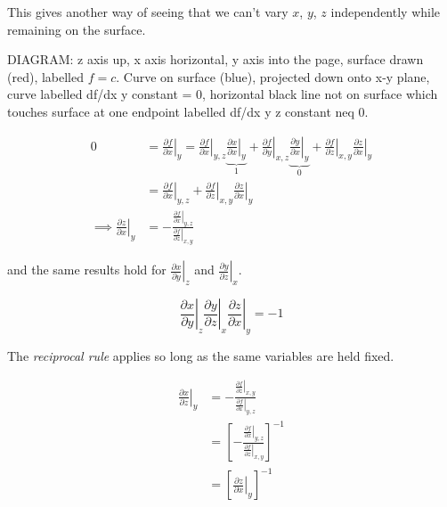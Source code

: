 \documentclass{../../template/note}
\begin{document}
    This gives another way of seeing that we can't vary \(x\), \(y\), \(z\) independently while remaining on the surface.

    DIAGRAM: z axis up, x axis horizontal, y axis into the page, surface drawn (red), labelled \(f = c\). Curve on surface (blue), projected down onto x-y plane, curve labelled df/dx y constant = 0, horizontal black line not on surface which touches surface at one endpoint labelled df/dx y z constant neq 0.

    \begin{align*}
        0 & = \left.\frac{\partial f}{\partial x}\right|_y = \left.\frac{\partial f}{\partial x}\right|_{y, z} \underbrace{\left.\frac{\partial x}{\partial x}\right|_{y}}_{1} + \left.\frac{\partial f}{\partial y}\right|_{x, z} \underbrace{\left.\frac{\partial y}{\partial x}\right|_{y}}_{0} + \left.\frac{\partial f}{\partial z}\right|_{x, y} \left.\frac{\partial z}{\partial x}\right|_{y} \\
        &= \left.\frac{\partial f}{\partial x}\right|_{y, z} + \left.\frac{\partial f}{\partial z}\right|_{x, y} \left.\frac{\partial z}{\partial x}\right|_{y} \\
        \implies \left.\frac{\partial z}{\partial x}\right|_{y} &= -\frac{\left.\frac{\partial f}{\partial x}\right|_{y, z}}{\left.\frac{\partial f}{\partial z}\right|_{x, y}}
    \end{align*}
    
    and the same results hold for \(\left.\frac{\partial x}{\partial y}\right|_{z}\) and \(\left.\frac{\partial y}{\partial z}\right|_{x}\).

    \begin{proposition}
        \[
            \left.\frac{\partial x}{\partial y}\right|_{z} \left.\frac{\partial y}{\partial z}\right|_{x} \left.\frac{\partial z}{\partial x}\right|_{y} = -1
        \]
    \end{proposition}
    
    The \emph{reciprocal rule} applies so long as the same variables are held fixed.

    \begin{align*}
        \left.\frac{\partial x}{\partial z}\right|_{y} &= -\frac{\left.\frac{\partial f}{\partial z}\right|_{x, y}}{\left.\frac{\partial f}{\partial x}\right|_{y, z}} \\
        &= \left[-\frac{\left.\frac{\partial f}{\partial x}\right|_{y, z}}{\left.\frac{\partial f}{\partial z}\right|_{x, y}}\right]^{-1} \\
        &= \left[\left.\frac{\partial z}{\partial x}\right|_{y}\right]^{-1}
    \end{align*}
    
\end{document}
